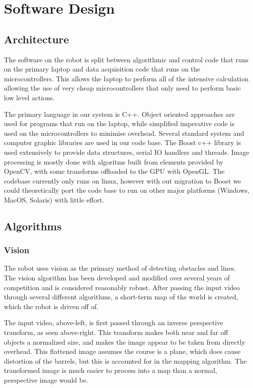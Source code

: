 \section{Software Design}

\subsection{Architecture}

The software on the robot is split between algorithmic and control code that runs on the primary laptop and data acquisition code that runs on the microcontrollers. This allows the laptop to perform all of the intensive calculation allowing the use of very cheap microcontrollers that only need to perform basic low level actions.

The primary language in our system is C++. Object oriented approaches are used for programs that run on the laptop, while simplified imperative code is used on the microcontrollers to minimise overhead. Several standard system and computer graphic libraries are used in our code base. The Boost c++ library is used extensively to provide data structures, serial IO handlers and threads. Image processing is mostly done with algoritms built from elements provided by OpenCV, with some transforms offloaded to the GPU with OpenGL. The codebase currently only runs on linux, however with out migration to Boost we could theoretically port the code base to run on other major platforms (Windows, MacOS, Solaris) with little effort.

\subsection{Algorithms}

\subsubsection{Vision}

The robot uses vision as the primary method of detecting obstacles and lines. The vision algorithm has been developed and modified over several years of competition and is considered reasonably robust. After passing the input video through several different algorithms, a short-term map of the world is created, which the robot is driven off of.

The input video, above-left, is first passed through an inverse perspective transform, as seen above-right. This transform makes both near and far off objects a normalized size, and makes the image appear to be taken from directly overhead. This flattened image assumes the course is a plane, which does cause distortion of the barrels, but this is accounted for in the mapping algorithm. The transformed image is much easier to process into a map than a normal, perspective image would be.

